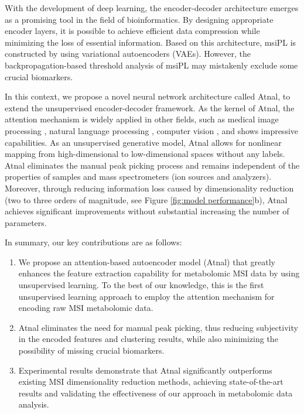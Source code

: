 \documentclass{WileyMSP-template}
\begin{document}
With the development of deep learning, the encoder-decoder architecture 
emerges as a promising tool in the field of bioinformatics.  
By designing appropriate encoder layers, it is possible to achieve efficient 
data compression while minimizing the loss of essential information. 
Based on this architecture, msiPL \cite{abdelmoula2021peak}
is constructed by using
variational autoencoders (VAEs). 
However, the backpropagation-based threshold analysis of msiPL
may mistakenly exclude some crucial biomarkers. 

In this context, we propose a novel neural network architecture 
called Atnal, to extend the unsupervised encoder-decoder framework. 
As the kernel of Atnal, the attention mechanism is widely applied 
in other fields, such as medical image 
processing \cite{sinha2020multi}, natural language processing \cite{devlin2018bert}, 
computer vision \cite{liu2021swin}, and shows  
impressive capabilities. 
As an unsupervised generative model, Atnal allows for nonlinear mapping 
from high-dimensional to low-dimensional spaces without any labels.
Atnal eliminates the manual  peak picking process \cite{abdelmoula2021peak}
and remains independent of the properties of samples and mass spectrometers 
(ion sources and analyzers). 
Moreover, through reducing information loss caused by dimensionality reduction (two 
to three orders of magnitude, see Figure \ref{fig:model performance}b), 
Atnal achieves significant improvements without 
substantial increasing the number of parameters. 

In summary, our key contributions are as follows:
\begin{enumerate}[label=\roman*.]
  \item We propose an attention-based autoencoder model (Atnal) that greatly 
  enhances the feature extraction capability for metabolomic MSI data by using 
  unsupervised learning. To the best of our knowledge, this is the first 
  unsupervised learning approach to 
  employ the attention mechanism for encoding raw MSI metabolomic data. 
  \item Atnal eliminates the need for manual peak picking, thus reducing subjectivity 
  in the encoded features and clustering results, 
  while also minimizing the possibility of missing crucial biomarkers.
  \item Experimental results demonstrate that Atnal significantly outperforms 
  existing MSI dimensionality reduction methods, achieving state-of-the-art 
  results and validating the effectiveness 
  of our approach in metabolomic data analysis.
\end{enumerate}
\end{document}
